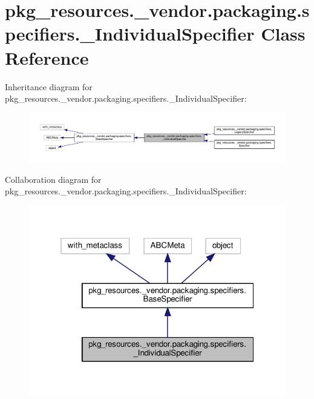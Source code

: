 \hypertarget{classpkg__resources_1_1__vendor_1_1packaging_1_1specifiers_1_1__IndividualSpecifier}{}\section{pkg\+\_\+resources.\+\_\+vendor.\+packaging.\+specifiers.\+\_\+\+Individual\+Specifier Class Reference}
\label{classpkg__resources_1_1__vendor_1_1packaging_1_1specifiers_1_1__IndividualSpecifier}


Inheritance diagram for pkg\+\_\+resources.\+\_\+vendor.\+packaging.\+specifiers.\+\_\+\+Individual\+Specifier\+:
\nopagebreak
\begin{figure}[H]
\begin{center}
\leavevmode
\includegraphics[width=350pt]{classpkg__resources_1_1__vendor_1_1packaging_1_1specifiers_1_1__IndividualSpecifier__inherit__graph}
\end{center}
\end{figure}


Collaboration diagram for pkg\+\_\+resources.\+\_\+vendor.\+packaging.\+specifiers.\+\_\+\+Individual\+Specifier\+:
\nopagebreak
\begin{figure}[H]
\begin{center}
\leavevmode
\includegraphics[width=319pt]{classpkg__resources_1_1__vendor_1_1packaging_1_1specifiers_1_1__IndividualSpecifier__coll__graph}
\end{center}
\end{figure}
